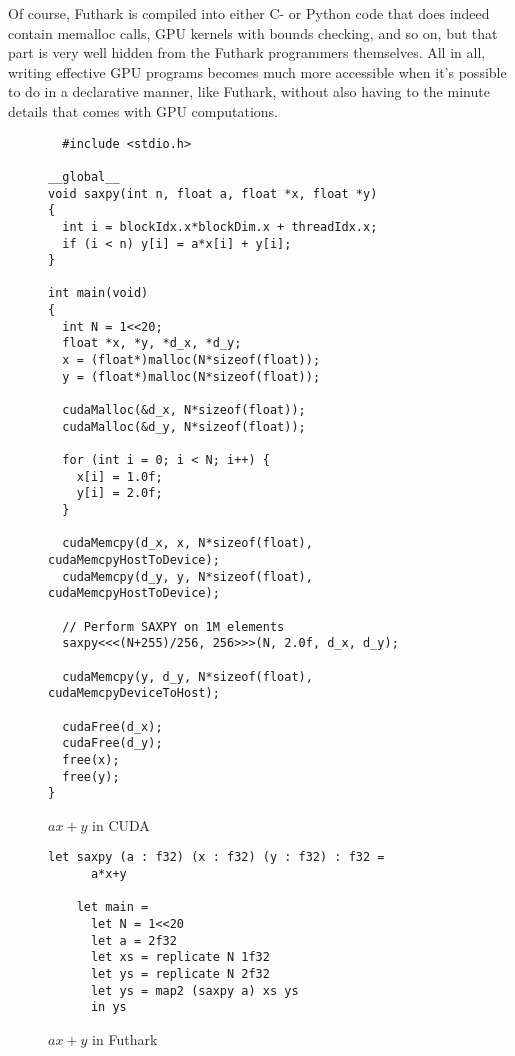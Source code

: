 Of course, Futhark is compiled into either C- or Python code that does indeed
contain memalloc calls, GPU kernels with bounds checking, and so on, but that
part is very well hidden from the Futhark programmers themselves.
All in all, writing effective GPU programs becomes much more accessible when it's
possible to do in a declarative manner, like Futhark, without also having to
the minute details that comes with GPU computations.
\begin{figure}
  \centering
\begin{verbatim}
  #include <stdio.h>

__global__
void saxpy(int n, float a, float *x, float *y)
{
  int i = blockIdx.x*blockDim.x + threadIdx.x;
  if (i < n) y[i] = a*x[i] + y[i];
}

int main(void)
{
  int N = 1<<20;
  float *x, *y, *d_x, *d_y;
  x = (float*)malloc(N*sizeof(float));
  y = (float*)malloc(N*sizeof(float));

  cudaMalloc(&d_x, N*sizeof(float)); 
  cudaMalloc(&d_y, N*sizeof(float));

  for (int i = 0; i < N; i++) {
    x[i] = 1.0f;
    y[i] = 2.0f;
  }

  cudaMemcpy(d_x, x, N*sizeof(float), cudaMemcpyHostToDevice);
  cudaMemcpy(d_y, y, N*sizeof(float), cudaMemcpyHostToDevice);

  // Perform SAXPY on 1M elements
  saxpy<<<(N+255)/256, 256>>>(N, 2.0f, d_x, d_y);

  cudaMemcpy(y, d_y, N*sizeof(float), cudaMemcpyDeviceToHost);

  cudaFree(d_x);
  cudaFree(d_y);
  free(x);
  free(y);
}
\end{verbatim}
  \caption{$ax + y$ in CUDA}
  \label{fig:cudasaxpy}
\end{figure}

\begin{figure}
  \centering
  \begin{lstlisting}[language=Futhark]
    let saxpy (a : f32) (x : f32) (y : f32) : f32 =
      a*x+y

    let main =
      let N = 1<<20
      let a = 2f32
      let xs = replicate N 1f32
      let ys = replicate N 2f32
      let ys = map2 (saxpy a) xs ys
      in ys
  \end{lstlisting}
  \caption{$ax+y$ in Futhark}
  \label{fig:futsaxpy}
\end{figure}

